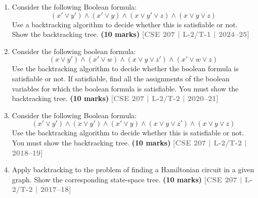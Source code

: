 \documentclass[12pt]{article}
\newcommand{\yr}[1]{\hfill\textcolor{gray}{\small\textbf{[#1]}}}
\newcommand{\mk}[1]{\textcolor{orange!70!black}{\small\textbf{(#1 marks)}}}
\begin{document}
\begin{enumerate}

\item Consider the following Boolean formula:
\[
(x' \vee y') \wedge (x' \vee y) \wedge (x \vee y' \vee z) \wedge (x \vee y \vee z)
\]
Use a backtracking algorithm to decide whether this is satisfiable or not. Show the backtracking tree.
\mk{10} \yr{CSE 207 | L-2/T-1 | 2024--25}


\item Consider the following boolean formula:
\[
(x \vee y') \wedge (x' \vee w) \wedge (x \vee y \vee z') \wedge (x' \vee w \vee z)
\]
Use the backtracking algorithm to decide whether the boolean formula is satisfiable or not. If satisfiable, find all the assignments of the boolean variables for which the boolean formula is satisfiable. You must show the backtracking tree.
\mk{10} \yr{CSE 207 | L-2/T-2 | 2020--21}


\item Consider the following Boolean formula:
\[
(x' \vee y') \wedge (x \vee y') \wedge (x' \vee y) \wedge (x \vee y \vee z') \wedge (x \vee y \vee z)
\]
Use the backtracking algorithm to decide whether this is satisfiable or not. You must show the backtracking tree.
\mk{10} \yr{CSE 207 | L-2/T-2 | 2018--19}


\item Apply backtracking to the problem of finding a Hamiltonian circuit in a given graph. Show the corresponding state-space tree. \mk{10}
\yr{CSE 207 | L-2/T-2 | 2017--18}

\begin{center}

\end{center}
\end{enumerate}
\end{document}
